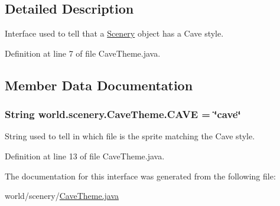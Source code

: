 \subsection{Detailed Description}
Interface used to tell that a \hyperlink{a00024}{Scenery} object has a Cave style. 

Definition at line 7 of file Cave\-Theme.\-java.



\subsection{Member Data Documentation}
\hypertarget{a00004_abbad3655c1d1f230dddfd7ecc5194f50}{
\subsubsection[{C\-A\-V\-E}]{\setlength{\rightskip}{0pt plus 5cm}String world.\-scenery.\-Cave\-Theme.\-C\-A\-V\-E = \char`\"{}cave\char`\"{}\hspace{0.3cm}{\ttfamily [static]}}}\label{a00004_abbad3655c1d1f230dddfd7ecc5194f50}


String used to tell in which file is the sprite matching the Cave style. 



Definition at line 13 of file Cave\-Theme.\-java.



The documentation for this interface was generated from the following file\-:\begin{DoxyCompactItemize}
\item 
world/scenery/\hyperlink{a00063}{Cave\-Theme.\-java}\end{DoxyCompactItemize}
